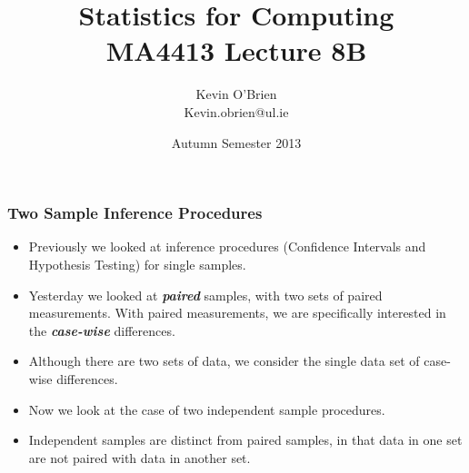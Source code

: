 \documentclass[a4]{beamer}
\title[MA4413]{Statistics for Computing \\ {\normalsize MA4413 Lecture 8B}}
\author[Kevin O'Brien]{Kevin O'Brien \\ {\scriptsize Kevin.obrien@ul.ie}}
\date{Autumn Semester 2013}
\institute[Maths \& Stats]{Dept. of Mathematics \& Statistics, \\ University \textit{of} Limerick}
\begin{document}
\begin{frame}
\titlepage
\end{frame}



\begin{frame}
\frametitle{Two Sample Inference Procedures}
\begin{itemize}
\item Previously we looked at inference procedures (Confidence Intervals and Hypothesis Testing) for single samples.
\item Yesterday we looked at \textit{\textbf{paired}} samples, with two sets of paired measurements. With paired measurements, we are specifically interested in the \textbf{\textit{case-wise}} differences.
\item Although there are two sets of data, we consider the single data set of case-wise differences.
\item Now we look at the case of two independent sample procedures.
\item Independent samples are distinct from paired samples, in that data in one set are not paired with data in another set.
\end{itemize}
\end{frame}
\end{document}
